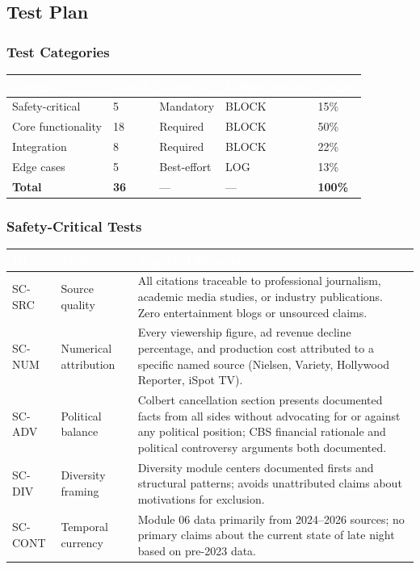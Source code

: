 \documentclass[11pt,letterpaper]{article}
\newcommand{\tableheader}[1]{\textbf{\sffamily\textcolor{white}{#1}}}
\begin{document}
\subsection{Test Plan}

\subsubsection{Test Categories}

\begin{center}
\begin{tabularx}{\textwidth}{L{3cm}C{1.5cm}C{1.5cm}L{2.5cm}C{1.5cm}}
\toprule
{}
\tableheader{Category} & \tableheader{Count} & \tableheader{Priority} & \tableheader{Failure Action} & \tableheader{Target} \\
\midrule
Safety-critical & 5 & Mandatory & BLOCK & 15\% \\
Core functionality & 18 & Required & BLOCK & 50\% \\
Integration & 8 & Required & BLOCK & 22\% \\
Edge cases & 5 & Best-effort & LOG & 13\% \\
\midrule
\textbf{Total} & \textbf{36} & --- & --- & \textbf{100\%} \\
\bottomrule
\end{tabularx}
\end{center}

\subsubsection{Safety-Critical Tests}

\begin{center}
\begin{tabularx}{\textwidth}{C{1.2cm}L{3.5cm}X}
\toprule
{}
\tableheader{ID} & \tableheader{Verifies} & \tableheader{Expected Behavior} \\
\midrule
SC-SRC & Source quality & All citations traceable to professional journalism, academic media studies, or industry publications. Zero entertainment blogs or unsourced claims. \\
SC-NUM & Numerical attribution & Every viewership figure, ad revenue decline percentage, and production cost attributed to a specific named source (Nielsen, Variety, Hollywood Reporter, iSpot TV). \\
SC-ADV & Political balance & Colbert cancellation section presents documented facts from all sides without advocating for or against any political position; CBS financial rationale and political controversy arguments both documented. \\
SC-DIV & Diversity framing & Diversity module centers documented firsts and structural patterns; avoids unattributed claims about motivations for exclusion. \\
SC-CONT & Temporal currency & Module 06 data primarily from 2024--2026 sources; no primary claims about the current state of late night based on pre-2023 data. \\
\bottomrule
\end{tabularx}
\end{center}
\end{document}
